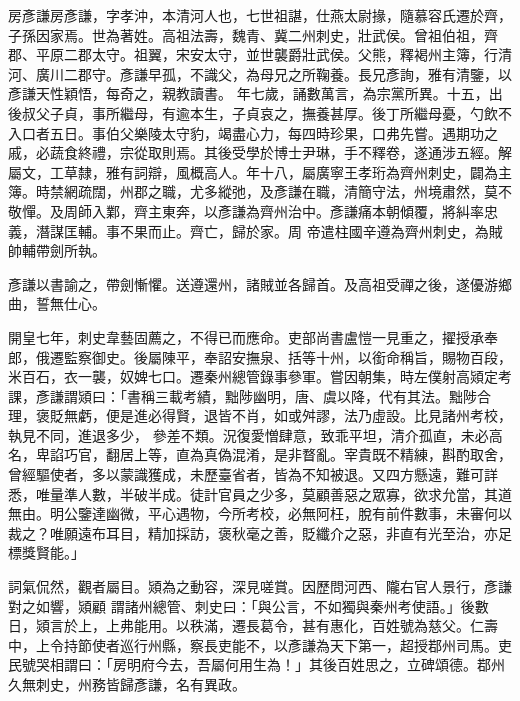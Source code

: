\begin{pinyinscope}
 房彥謙房彥謙，字孝沖，本清河人也，七世祖諶，仕燕太尉掾，隨慕容氏遷於齊，子孫因家焉。世為著姓。高祖法壽，魏青、冀二州刺史，壯武侯。曾祖伯祖，齊郡、平原二郡太守。祖翼，宋安太守，並世襲爵壯武侯。父熊，釋褐州主簿，行清河、廣川二郡守。彥謙早孤，不識父，為母兄之所鞠養。長兄彥詢，雅有清鑒，以彥謙天性穎悟，每奇之，親教讀書。
 年七歲，誦數萬言，為宗黨所異。十五，出後叔父子貞，事所繼母，有逾本生，子貞哀之，撫養甚厚。後丁所繼母憂，勺飲不入口者五日。事伯父樂陵太守豹，竭盡心力，每四時珍果，口弗先嘗。遇期功之戚，必蔬食終禮，宗從取則焉。其後受學於博士尹琳，手不釋卷，遂通涉五經。解屬文，工草隸，雅有詞辯，風概高人。年十八，屬廣寧王孝珩為齊州刺史，闢為主簿。時禁網疏闊，州郡之職，尤多縱弛，及彥謙在職，清簡守法，州境肅然，莫不敬憚。及周師入鄴，齊主東奔，以彥謙為齊州治中。彥謙痛本朝傾覆，將糾率忠義，潛謀匡輔。事不果而止。齊亡，歸於家。周
 帝遣柱國辛遵為齊州刺史，為賊帥輔帶劍所執。



 彥謙以書諭之，帶劍慚懼。送遵還州，諸賊並各歸首。及高祖受禪之後，遂優游鄉曲，誓無仕心。



 開皇七年，刺史韋藝固薦之，不得已而應命。吏部尚書盧愷一見重之，擢授承奉郎，俄遷監察御史。後屬陳平，奉詔安撫泉、括等十州，以銜命稱旨，賜物百段，米百石，衣一襲，奴婢七口。遷秦州總管錄事參軍。嘗因朝集，時左僕射高熲定考課，彥謙謂熲曰：「書稱三載考績，黜陟幽明，唐、虞以降，代有其法。黜陟合理，褒貶無虧，便是進必得賢，退皆不肖，如或舛謬，法乃虛設。比見諸州考校，執見不同，進退多少，
 參差不類。況復愛憎肆意，致乖平坦，清介孤直，未必高名，卑諂巧官，翻居上等，直為真偽混淆，是非瞀亂。宰貴既不精練，斟酌取舍，曾經驅使者，多以蒙識獲成，未歷臺省者，皆為不知被退。又四方懸遠，難可詳悉，唯量準人數，半破半成。徒計官員之少多，莫顧善惡之眾寡，欲求允當，其道無由。明公鑒達幽微，平心遇物，今所考校，必無阿枉，脫有前件數事，未審何以裁之？唯願遠布耳目，精加採訪，褒秋毫之善，貶纖介之惡，非直有光至治，亦足標獎賢能。」



 詞氣侃然，觀者屬目。熲為之動容，深見嗟賞。因歷問河西、隴右官人景行，彥謙對之如響，熲顧
 謂諸州總管、刺史曰：「與公言，不如獨與秦州考使語。」後數日，熲言於上，上弗能用。以秩滿，遷長葛令，甚有惠化，百姓號為慈父。仁壽中，上令持節使者巡行州縣，察長吏能不，以彥謙為天下第一，超授鄀州司馬。吏民號哭相謂曰：「房明府今去，吾屬何用生為！」其後百姓思之，立碑頌德。鄀州久無刺史，州務皆歸彥謙，名有異政。




\end{pinyinscope}
